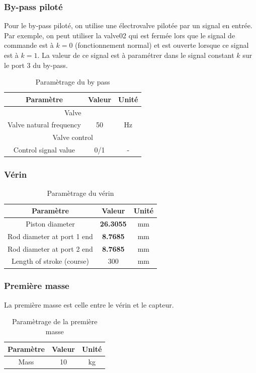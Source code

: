 \documentclass[a4paper,12pt,calibri,oneside,openany]{book}
\theoremstyle{break}
\begin{document}
\subsubsection{By-pass piloté}
Pour le by-pass piloté, on utilise une électrovalve pilotée par un signal en entrée. Par exemple, on peut utiliser la valve02 qui est fermée lors que le signal de commande est à $k=0$ (fonctionnement normal) et est ouverte lorsque ce signal est à $k=1$. La valeur de ce signal est à paramétrer dans le signal constant $k$ sur le port $3$ du by-pass.
\begin{table}[H]
	\centering
	\begin{tabular}{|c|c|c|}
		\hline
		\cellcolor{gray!30}Paramètre & \cellcolor{gray!30}Valeur & \cellcolor{gray!30}Unité\\
		\hline
		\multicolumn{3}{c}{\cellcolor{green!30}Valve} \\
		\hline
		Valve natural frequency & 50 & Hz\\
		\hline
		\multicolumn{3}{c}{\cellcolor{green!30}Valve control} \\
		\hline
		Control signal value & 0/1 & -\\
		\hline
	\end{tabular}
	\caption{Paramètrage du by pass}
\end{table}
\subsubsection{Vérin}

\begin{table}[H]
	\centering
	\begin{tabular}{|c|c|c|}
		\hline
		\cellcolor{gray!30}Paramètre & \cellcolor{gray!30}Valeur & \cellcolor{gray!30}Unité\\
		\hline
		Piston diameter & \textbf{26.3055} & mm\\
		\hline
		Rod diameter at port 1 end & \textbf{8.7685} & mm\\
		\hline
		Rod diameter at port 2 end & \textbf{8.7685} & mm\\
		\hline
		Length of stroke (course) & 300 & mm\\
		\hline
	\end{tabular}
	\caption{Paramètrage du vérin}
\end{table}
\subsubsection{Première masse}
La première masse est celle entre le vérin et le capteur.
\begin{table}[H]
	\centering
	\begin{tabular}{|c|c|c|}
		\hline
		\cellcolor{gray!30}Paramètre & \cellcolor{gray!30}Valeur & \cellcolor{gray!30}Unité\\
		\hline
		Mass & 10 & kg\\
		\hline
	\end{tabular}
	\caption{Paramètrage de la première masse}
\end{table}
\end{document}
